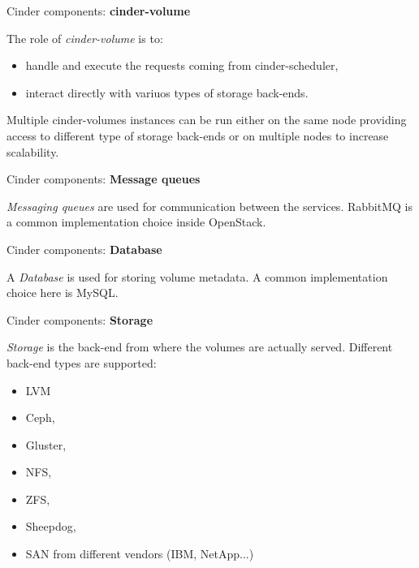 \documentclass[english,serif,mathserif]{beamer}
\begin{document}
\begin{frame}{Cinder components: \textbf{cinder-volume}}

The role of \textit{cinder-volume} is to:
\begin{itemize}
\item handle and execute the requests coming from cinder-scheduler,
\item interact directly with variuos types of storage back-ends.
\end{itemize}

Multiple cinder-volumes instances can be run either on the same node 
providing access to different type of storage back-ends or on multiple 
nodes to increase scalability. 

\end{frame}

\begin{frame}{Cinder components: \textbf{Message queues}}

\textit{Messaging queues} are used for communication between the services.
RabbitMQ is a common implementation choice inside OpenStack.  

\end{frame}

\begin{frame}{Cinder components: \textbf{Database}}

A \textit{Database} is used for storing volume metadata. 
A common implementation choice here is MySQL. 

\end{frame}

\begin{frame}{Cinder components: \textbf{Storage}}

\textit{Storage} is the back-end from where the volumes are actually served. 
Different back-end types are supported:

\begin{itemize}
\item LVM 
\item Ceph,
\item Gluster,
\item NFS,
\item ZFS,
\item Sheepdog,
\item SAN from different vendors (IBM, NetApp...)
\end{itemize} 

\end{frame}
\end{document}
